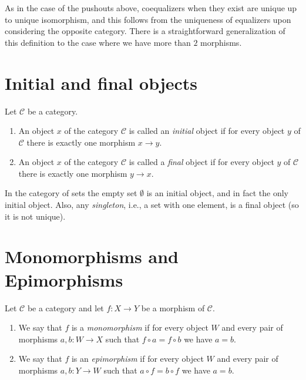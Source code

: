 \noindent
As in the case of the pushouts above, coequalizers when
they exist are unique up to unique isomorphism, and this follows
from the uniqueness of equalizers upon considering the opposite
category. There is a straightforward generalization of this definition
to the case where we have more than $2$ morphisms.

\section{Initial and final objects}
\label{section-initial-final}

\begin{definition}
\label{definition-initial-final}
Let $\mathcal{C}$ be a category.
\begin{enumerate}
\item An object $x$ of the category $\mathcal{C}$ is called
an {\it initial} object if for every object $y$ of $\mathcal{C}$
there is exactly one morphism $x \to y$.
\item An object $x$ of the category $\mathcal{C}$ is called
a {\it final} object if for every object $y$ of $\mathcal{C}$
there is exactly one morphism $y \to x$.
\end{enumerate}
\end{definition}

\noindent
In the category of sets the empty set $\emptyset$ is an
initial object, and in fact the only initial object.
Also, any {\it singleton}, i.e., a set with one element,
is a final object (so it is not unique).




\section{Monomorphisms and Epimorphisms}
\label{section-mono-epi}

\begin{definition}
\label{definition-mono-epi}
Let $\mathcal{C}$ be a category and let $f : X \to Y$ be
a morphism of $\mathcal{C}$.
\begin{enumerate}
\item We say that $f$ is a {\it monomorphism} if for every object
$W$ and every pair of morphisms $a, b : W \to X$ such that
$f \circ a = f \circ b$ we have $a = b$.
\item We say that $f$ is an {\it epimorphism} if for every object
$W$ and every pair of morphisms $a, b : Y \to W$ such that
$a \circ f = b \circ f$ we have $a = b$.
\end{enumerate}
\end{definition}

